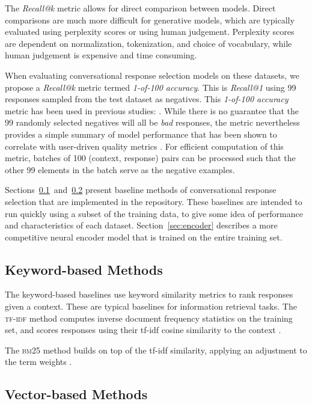 \documentclass[11pt,a4paper,table]{article}
\begin{document}
The \emph{Recall@k} metric allows for direct comparison between models. Direct comparisons are much more difficult for generative models, which are typically evaluated using perplexity scores or using human judgement. Perplexity scores are dependent on normalization, tokenization, and choice of vocabulary, while human judgement is expensive and time consuming.

When evaluating conversational response selection models on these datasets, we propose a \emph{Recall@k} metric termed \emph{1-of-100 accuracy}. This is \emph{Recall@1} using 99 responses sampled from the test dataset as negatives. This \emph{1-of-100 accuracy} metric has been used in previous studies: \cite{AlRfou:2016arxiv, Henderson:2017arxiv, Cer:2018arxiv, Kumar2018, Yang:2018repl, gunasekara2019dstc7}. While there is no guarantee that the 99 randomly selected negatives will all be \emph{bad} responses, the metric nevertheless provides a simple summary of model performance that has been shown to correlate with user-driven quality metrics \cite{Henderson:2017arxiv}. For efficient computation of this metric, batches of 100 (context, response) pairs can be processed such that the other 99 elements in the batch serve as the negative examples.

Sections~\ref{sec:keyword}~and~\ref{sec:vector} present baseline methods of conversational response selection that are implemented in the repository. These baselines are intended to run quickly using a subset of the training data, to give some idea of performance and characteristics of each dataset. Section~\ref{sec:encoder} describes a more competitive neural encoder model that is trained on the entire training set.

\subsection{Keyword-based Methods} \label{sec:keyword}

The keyword-based baselines use keyword similarity metrics to rank responses given a context. These are typical baselines for information retrieval tasks. The \textsc{tf-idf} method computes inverse document frequency statistics on the training set, and scores responses using their tf-idf cosine similarity to the context \cite{Manning:2008ir}.

The \textsc{bm25} method builds on top of the tf-idf similarity, applying an adjustment to the term weights \cite{Robertson:2009}.

\subsection{Vector-based Methods} \label{sec:vector}
\end{document}
